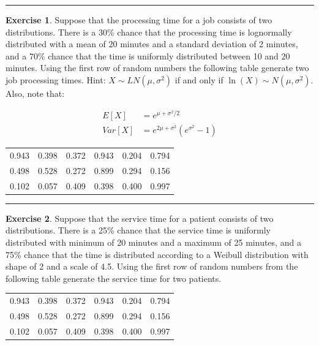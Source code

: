 \documentclass[
]{book}
\theoremstyle{definition}
\theoremstyle{definition}
\theoremstyle{definition}
\newtheorem{exercise}{Exercise}[chapter]
\theoremstyle{definition}
\theoremstyle{remark}
\begin{document}
\begin{center}\rule{0.5\linewidth}{0.5pt}\end{center}

\begin{exercise}
\protect\hypertarget{exr:AppRNRVP25}{}{\label{exr:AppRNRVP25} } Suppose that the processing time for a job consists of two distributions. There
is a 30\% chance that the processing time is lognormally distributed with
a mean of 20 minutes and a standard deviation of 2 minutes, and a 70\%
chance that the time is uniformly distributed between 10 and 20 minutes.
Using the first row of random numbers the following table generate two job processing times. Hint:
\(X \sim LN(\mu, \sigma^2)\) if and only if
\(\ln(X) \sim N(\mu, \sigma^2)\). Also, note that:

\[\begin{aligned}
E[X] & = e^{\mu + \sigma^{2}/2}\\
Var[X] & = e^{2\mu + \sigma^{2}}\left(e^{\sigma^{2}} - 1\right)\end{aligned}\]
\end{exercise}

\begin{longtable}[]{@{}cccccc@{}}
\toprule
\endhead
0.943 & 0.398 & 0.372 & 0.943 & 0.204 & 0.794 \\
0.498 & 0.528 & 0.272 & 0.899 & 0.294 & 0.156 \\
0.102 & 0.057 & 0.409 & 0.398 & 0.400 & 0.997 \\
\bottomrule
\end{longtable}

\begin{center}\rule{0.5\linewidth}{0.5pt}\end{center}

\begin{exercise}
\protect\hypertarget{exr:AppRNRVP26}{}{\label{exr:AppRNRVP26} }Suppose that the service time for a patient consists of two distributions. There
is a 25\% chance that the service time is uniformly distributed with
minimum of 20 minutes and a maximum of 25 minutes, and a 75\% chance that
the time is distributed according to a Weibull distribution with shape
of 2 and a scale of 4.5. Using the first row of random numbers from
the following table generate the service time for two patients.
\end{exercise}

\begin{longtable}[]{@{}cccccc@{}}
\toprule
\endhead
0.943 & 0.398 & 0.372 & 0.943 & 0.204 & 0.794 \\
0.498 & 0.528 & 0.272 & 0.899 & 0.294 & 0.156 \\
0.102 & 0.057 & 0.409 & 0.398 & 0.400 & 0.997 \\
\bottomrule
\end{longtable}
\end{document}
